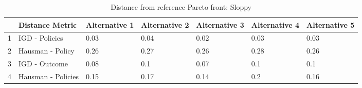 \begin{table}[ht]
\centering
\begin{tabular}{rllllll}
  \hline
 & Distance Metric & Alternative 1 & Alternative 2 & Alternative 3 & Alternative 4 & Alternative 5 \\ 
  \hline
1 & IGD - Policies & 0.03 & 0.04 & 0.02 & 0.03 & 0.03 \\ 
  2 & Hausman - Policy & 0.26 & 0.27 & 0.26 & 0.28 & 0.26 \\ 
  3 & IGD - Outcome & 0.08 & 0.1 & 0.07 & 0.1 & 0.1 \\ 
  4 & Hausman - Policies & 0.15 & 0.17 & 0.14 & 0.2 & 0.16 \\ 
   \hline
\end{tabular}
\caption{Distance from reference Pareto front: Sloppy} 
\label{distance_matrix_Low.tex}
\end{table}
